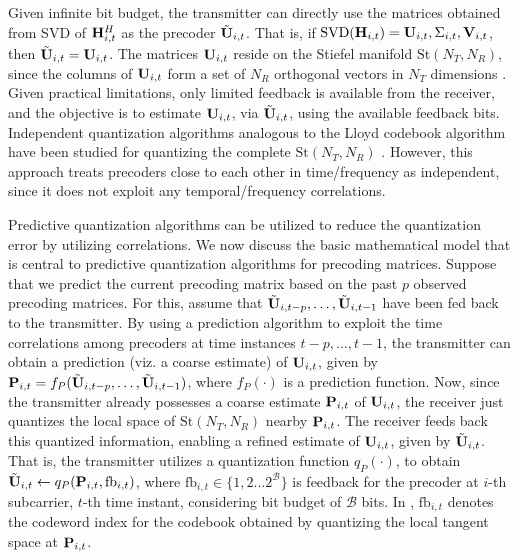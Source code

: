 \documentclass[conference]{IEEEtran}
\begin{document}
{Given infinite bit budget, the transmitter can directly use the matrices obtained from SVD of ${\bf H}^{H}_{i,t}$ as the precoder $\tilde{{\bf U}}_{i,t}$.
That is, if $\text{SVD}({\bf H}_{i,t}) = {\bf U}_{i,t},\Sigma_{i,t}, {\bf V}_{i,t}$, then $\tilde{{\bf U}}_{i,t} = {\bf U}_{i,t}$.
The matrices ${\bf U}_{i,t}$ reside on the Stiefel manifold $\text{St}(N_T,N_R)$, since the columns of ${\bf U}_{i,t}$ form a set of $N_R$ orthogonal vectors in $N_T$ dimensions \cite{Gupt1905:Predictive,6891198}.
Given practical limitations, only limited feedback is available from the receiver, and the objective is to estimate ${\bf U}_{i,t}$, via $\tilde{{\bf U}}_{i,t}$, using the available feedback bits. Independent quantization algorithms analogous to the Lloyd codebook algorithm have been studied for quantizing the complete $\text{St}(N_T,N_R)$ \cite{6678348}.
However, this approach treats precoders close to each other in time/frequency as independent, since it does not exploit any temporal/frequency correlations.

Predictive quantization algorithms \cite{Gupt1905:Predictive,6891198} can be utilized to reduce the quantization error by utilizing correlations.
We now discuss the basic mathematical model that is central to predictive quantization algorithms for precoding matrices.
Suppose that we predict the current precoding matrix based on the past $p$ observed precoding matrices. For this, assume that $\tilde{{\bf U}}_{i,t-p},\ldots,\tilde{{\bf U}}_{i,t-1}$ have been fed back to the transmitter.
By using a prediction algorithm to exploit the time correlations among precoders at time instances $t-p,\ldots,t-1$, the transmitter can obtain a prediction (viz. a coarse estimate) of ${\bf U}_{i,t}$, given by ${\bf P}_{i,t}=f_P(\tilde{{\bf U}}_{i,t-p},\ldots,\tilde{{\bf U}}_{i,t-1})$, where $f_P(\cdot)$ is a prediction function.
Now, since the transmitter already possesses a coarse estimate ${\bf P}_{i,t}$ of ${\bf U}_{i,t}$, the receiver just quantizes the local space of $\text{St}(N_T,N_R)$ nearby ${\bf P}_{i,t}$. The receiver feeds back this quantized information, enabling a refined estimate of ${\bf U}_{i,t}$, given by $\tilde{{\bf U}}_{i,t}$.
That is, the transmitter utilizes a quantization function $q_P(\cdot)$, to obtain $\tilde{{\bf U}}_{i,t} \gets q_P({\bf P}_{i,t},\text{fb}_{i,t})$, where $\text{fb}_{i,t} \in \{1,2\ldots2^{\mathcal{B}}\}$ is feedback for the precoder at $i$-th subcarrier, $t$-th time instant, considering bit budget of $\mathcal{B}$ bits.
In \cite{Gupt1905:Predictive,6891198,6545375}, $\text{fb}_{i,t}$ denotes the codeword index for the codebook obtained by quantizing the local tangent space at ${\bf P}_{i,t}$.

}
\end{document}
